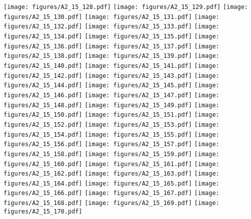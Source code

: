 \documentclass[12pt,a4paper]{article}
\begin{document}
\texttt{[image: figures/A2\_15\_128.pdf]}
\texttt{[image: figures/A2\_15\_129.pdf]}
\texttt{[image: figures/A2\_15\_130.pdf]}
\texttt{[image: figures/A2\_15\_131.pdf]}
\texttt{[image: figures/A2\_15\_132.pdf]}
\texttt{[image: figures/A2\_15\_133.pdf]}
\texttt{[image: figures/A2\_15\_134.pdf]}
\texttt{[image: figures/A2\_15\_135.pdf]}
\texttt{[image: figures/A2\_15\_136.pdf]}
\texttt{[image: figures/A2\_15\_137.pdf]}
\texttt{[image: figures/A2\_15\_138.pdf]}
\texttt{[image: figures/A2\_15\_139.pdf]}
\texttt{[image: figures/A2\_15\_140.pdf]}
\texttt{[image: figures/A2\_15\_141.pdf]}
\texttt{[image: figures/A2\_15\_142.pdf]}
\texttt{[image: figures/A2\_15\_143.pdf]}
\texttt{[image: figures/A2\_15\_144.pdf]}
\texttt{[image: figures/A2\_15\_145.pdf]}
\texttt{[image: figures/A2\_15\_146.pdf]}
\texttt{[image: figures/A2\_15\_147.pdf]}
\texttt{[image: figures/A2\_15\_148.pdf]}
\texttt{[image: figures/A2\_15\_149.pdf]}
\texttt{[image: figures/A2\_15\_150.pdf]}
\texttt{[image: figures/A2\_15\_151.pdf]}
\texttt{[image: figures/A2\_15\_152.pdf]}
\texttt{[image: figures/A2\_15\_153.pdf]}
\texttt{[image: figures/A2\_15\_154.pdf]}
\texttt{[image: figures/A2\_15\_155.pdf]}
\texttt{[image: figures/A2\_15\_156.pdf]}
\texttt{[image: figures/A2\_15\_157.pdf]}
\texttt{[image: figures/A2\_15\_158.pdf]}
\texttt{[image: figures/A2\_15\_159.pdf]}
\texttt{[image: figures/A2\_15\_160.pdf]}
\texttt{[image: figures/A2\_15\_161.pdf]}
\texttt{[image: figures/A2\_15\_162.pdf]}
\texttt{[image: figures/A2\_15\_163.pdf]}
\texttt{[image: figures/A2\_15\_164.pdf]}
\texttt{[image: figures/A2\_15\_165.pdf]}
\texttt{[image: figures/A2\_15\_166.pdf]}
\texttt{[image: figures/A2\_15\_167.pdf]}
\texttt{[image: figures/A2\_15\_168.pdf]}
\texttt{[image: figures/A2\_15\_169.pdf]}
\texttt{[image: figures/A2\_15\_170.pdf]}
\end{document}

